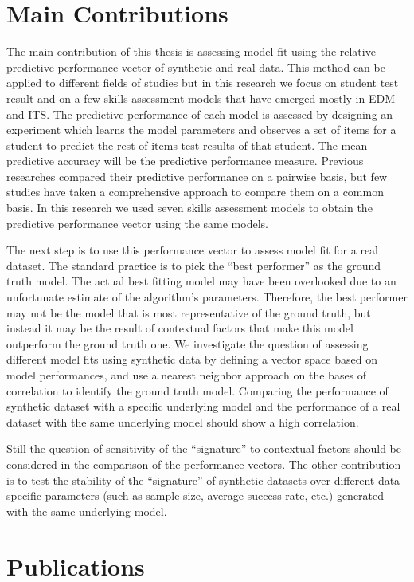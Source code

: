\section{Main Contributions}

The main contribution of this thesis is assessing model fit using the relative predictive performance vector of synthetic and real data. This method can be applied to different fields of studies but in this research we focus on student test result and on a few skills assessment models that have emerged mostly in EDM and ITS. The predictive performance of each model is assessed by designing an experiment which learns the model parameters and observes a set of items for a student to predict the rest of items test results of that student. The mean predictive accuracy will be the predictive performance measure. Previous researches compared their predictive performance  on a pairwise basis, but few studies have taken a comprehensive approach to compare them on a common basis. In this research we used seven skills assessment models to obtain the predictive performance vector using the same models. 

The next step is to use this performance vector to assess model fit for a real dataset. The standard practice is to pick the ``best performer'' as the ground truth model. The actual best fitting model may have been overlooked due to an unfortunate estimate of the algorithm's parameters.  Therefore, the best performer may not be the model that is most representative of the ground truth, but instead it may be the result of contextual factors that make this model outperform the ground truth one. We investigate the question of assessing different model fits using synthetic data by defining a vector space based on model performances, and use a nearest neighbor approach on the bases of correlation to identify the ground truth model. Comparing the performance of synthetic dataset with a specific underlying model and the performance of a real dataset with the same underlying model should show a high correlation. 

Still the question of sensitivity of the ``signature'' to contextual factors should be considered in the comparison of the performance vectors. The other contribution is to test the stability of the ``signature'' of synthetic datasets over different data specific parameters (such as sample size, average success rate, etc.) generated with the same underlying model. 


\section{Publications}

